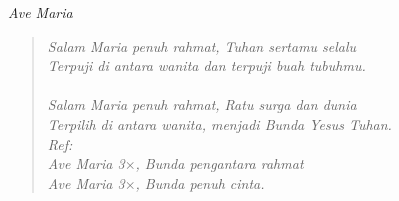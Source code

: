 \scriptsize
\begin{center}
\itshape{Ave Maria}
\end{center}

\begin{verse}
\itshape{
Salam Maria penuh rahmat, Tuhan sertamu selalu\\
Terpuji di antara wanita dan terpuji buah tubuhmu.\\
{~}\\
Salam Maria penuh rahmat, Ratu surga dan dunia\\
Terpilih di antara wanita, menjadi Bunda Yesus Tuhan.
{~}\\
Ref:\\
Ave Maria 3$\times$, Bunda pengantara rahmat\\
Ave Maria 3$\times$, Bunda penuh cinta.\\
}
\end{verse}
\normalsize
